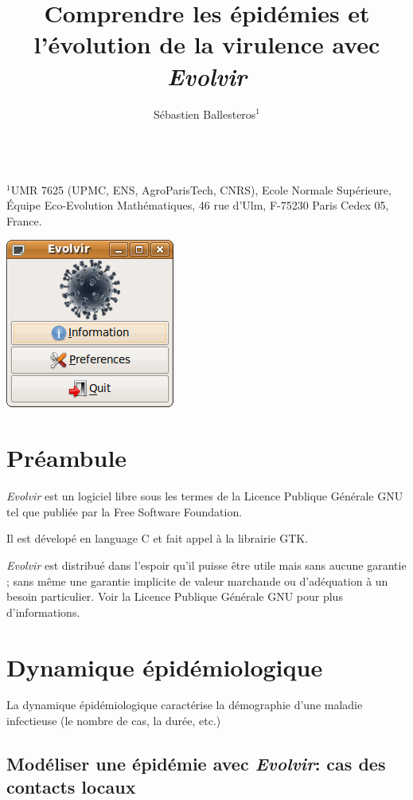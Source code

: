 \documentclass[12pt]{article}
\title{Comprendre les épidémies et l'évolution de la virulence avec \textit{Evolvir}}
\author{Sébastien Ballesteros$^{1}$}
\date{}
\begin{document}
\maketitle

~ \\
$^1$UMR 7625 (UPMC, ENS, AgroParisTech, CNRS), Ecole Normale
Supérieure, Équipe Eco-Evolution Mathématiques, 46 rue d'Ulm,
F-75230 Paris Cedex 05, France. \
~ \\


\begin{center}
  \includegraphics[]{graph/welcome.png}
\end{center}

\tableofcontents


\clearpage

\section{Préambule}

\textit{Evolvir} est un logiciel libre sous les termes de la Licence
Publique Générale GNU tel que publiée par la Free Software Foundation.

Il est dévelopé en language C et fait appel à la librairie GTK.

\textit{Evolvir} est distribué dans l'espoir qu'il puisse être utile
mais sans aucune garantie ; sans même une garantie implicite de valeur
marchande ou d'adéquation à un besoin particulier.  Voir la Licence
Publique Générale GNU pour plus d'informations.


\section{Dynamique épidémiologique}


La dynamique épidémiologique caractérise la démographie d'une maladie
infectieuse (le nombre de cas, la durée, etc.)

\subsection{Modéliser une épidémie avec \textit{Evolvir}: cas des contacts locaux}
\end{document}
